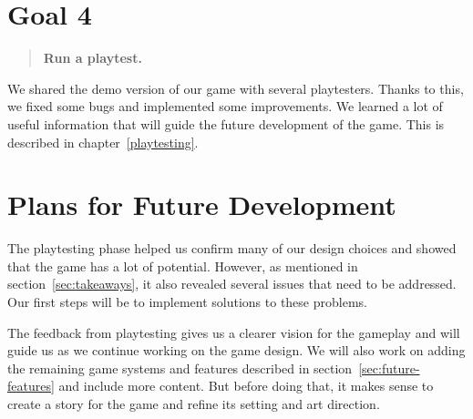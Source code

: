 \section{Goal 4}

\begin{quotation}
    \textbf{Run a playtest.}
\end{quotation}

We shared the demo version of our game with several playtesters.
Thanks to this, we fixed some bugs and implemented some improvements.
We learned a lot of useful information that will guide the future development of the game.
This is described in chapter~\ref{playtesting}.

\section{Plans for Future Development}

The playtesting phase helped us confirm many of our design choices and showed that the game has a lot of potential.
However, as mentioned in section~\ref{sec:takeaways}, it also revealed several issues that need to be addressed.
Our first steps will be to implement solutions to these problems.

The feedback from playtesting gives us a clearer vision for the gameplay and will guide us as we continue working on the game design.
We will also work on adding the remaining game systems and features described in section~\ref{sec:future-features} and include more content.
But before doing that, it makes sense to create a story for the game and refine its setting and art direction.